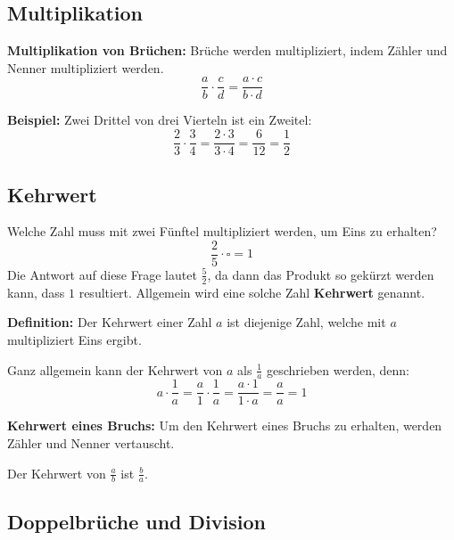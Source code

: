 \subsection{Multiplikation}

\begin{theorem}
  \textbf{Multiplikation von Brüchen:} Brüche werden multipliziert, indem Zähler und Nenner multipliziert werden.
  \[
    \frac{a}{b}\cdot\frac{c}{d} = \frac{a\cdot c}{b\cdot d}
  \]
\end{theorem}
\begin{example}
  \textbf{Beispiel:} Zwei Drittel von drei Vierteln ist ein Zweitel:
  \[
    \frac{2}{3}\cdot\frac{3}{4} = \frac{2\cdot 3}{3\cdot 4} = \frac{6}{12} = \frac{1}{2}
  \]
\end{example}

\subsection{Kehrwert}

Welche Zahl muss mit zwei Fünftel multipliziert werden, um Eins zu erhalten?
\[
  \frac{2}{5}\cdot\square = 1
\]
Die Antwort auf diese Frage lautet $\frac{5}{2}$, da dann das Produkt so gekürzt werden kann, dass $1$ resultiert. Allgemein wird eine solche Zahl \textbf{Kehrwert} genannt.

\textbf{Definition:} Der Kehrwert einer Zahl $a$ ist diejenige Zahl, welche mit $a$ multipliziert Eins ergibt.

Ganz allgemein kann der Kehrwert von $a$ als $\frac{1}{a}$ geschrieben werden, denn:
\[
  a\cdot \frac{1}{a} = \frac{a}{1}\cdot\frac{1}{a} = \frac{a\cdot 1}{1\cdot a} = \frac{a}{a} = 1
\]
\begin{theorem}
  \textbf{Kehrwert eines Bruchs:} Um den Kehrwert eines Bruchs zu erhalten, werden Zähler und Nenner vertauscht.

  Der Kehrwert von $\displaystyle\frac{a}{b}$ ist $\displaystyle\frac{b}{a}$.
\end{theorem}

\newpage
\subsection{Doppelbrüche und Division}

